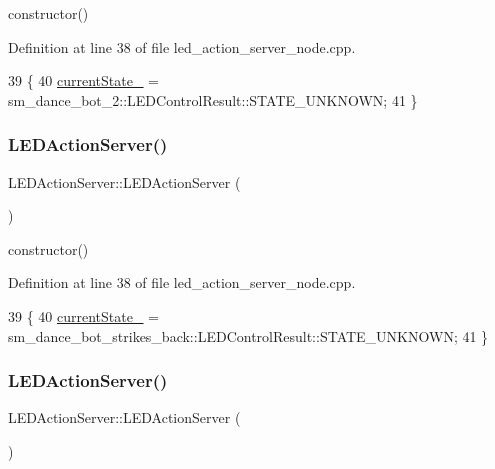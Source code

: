 constructor() 

Definition at line 38 of file led\+\_\+action\+\_\+server\+\_\+node.\+cpp.


\begin{DoxyCode}
39   \{
40     \hyperlink{classLEDActionServer_a1dc456e987dc331501ad6ff2215661ff}{currentState\_} =  sm\_dance\_bot\_2::LEDControlResult::STATE\_UNKNOWN;
41   \}
\end{DoxyCode}
\mbox{\label{classLEDActionServer_a6978c43940438b9fd8bfcd6b443092d3}} 
\subsubsection{\texorpdfstring{L\+E\+D\+Action\+Server()}{LEDActionServer()}\hspace{0.1cm}{\footnotesize\ttfamily [3/5]}}
{\footnotesize\ttfamily L\+E\+D\+Action\+Server\+::\+L\+E\+D\+Action\+Server (\begin{DoxyParamCaption}{ }\end{DoxyParamCaption})\hspace{0.3cm}{\ttfamily [inline]}}

constructor() 

Definition at line 38 of file led\+\_\+action\+\_\+server\+\_\+node.\+cpp.


\begin{DoxyCode}
39   \{
40     \hyperlink{classLEDActionServer_a1dc456e987dc331501ad6ff2215661ff}{currentState\_} =  sm\_dance\_bot\_strikes\_back::LEDControlResult::STATE\_UNKNOWN;
41   \}
\end{DoxyCode}
\mbox{\label{classLEDActionServer_a6978c43940438b9fd8bfcd6b443092d3}} 
\subsubsection{\texorpdfstring{L\+E\+D\+Action\+Server()}{LEDActionServer()}\hspace{0.1cm}{\footnotesize\ttfamily [4/5]}}
{\footnotesize\ttfamily L\+E\+D\+Action\+Server\+::\+L\+E\+D\+Action\+Server (\begin{DoxyParamCaption}{ }\end{DoxyParamCaption})\hspace{0.3cm}{\ttfamily [inline]}}

